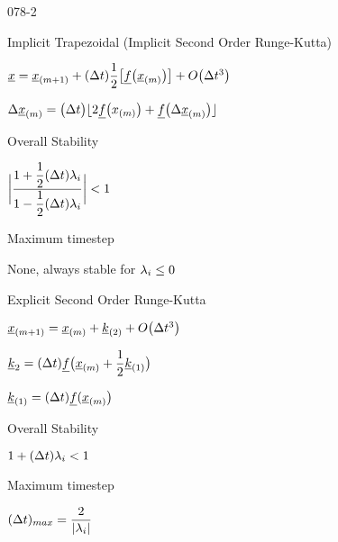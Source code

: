 \begin{mitframe}{078-2}
\begin{listone}
	\item Implicit Trapezoidal (Implicit Second Order Runge-Kutta)
    \begin{listtwo}
    	\item $\uline{\disp}=\uline{\disp}_{(\mass+1)}+(\iipf\timet)\dfrac{1}{2}\big[\uline{\fug}\big(\uline{\disp}_{(\mass)}\big)\big]+O\big(\iipf\timet^3\big)$
        \item $\iipf\uline{\disp}_{(\mass)}=\big(\iipf\timet\big)\lfloor{2}\uline{\fug}\big(\disp_{(\mass)}\big)+\uline{\fug}\big(\iipf\uline{\disp}_{(\mass)}\big)\rfloor$
		\item Overall Stability
        	\begin{listthree}
            	\item $\bigg|\dfrac{1+\dfrac{1}{2}(\iipf\timet)\wavel_{\state}}{1-\dfrac{1}{2}(\iipf\timet)\wavel_{\state}}\bigg|<1$
            \end{listthree}
        \item Maximum timestep
			\begin{listthree}
            	\item None, always stable for $\wavel_{\state}\leq{0}$
            \end{listthree}
    \end{listtwo}
    \item Explicit Second Order Runge-Kutta
    	\begin{listtwo}
        	\item $\uline{\disp}_{(\mass+1)}=\uline{\disp}_{(\mass)}+\uline{\thermcond}_{(2)}+O\big(\iipf\timet^3\big)$
            \begin{listthree}
            	\item $\uline{\thermcond}_{2}=(\iipf\timet)\uline{\fug}\big(\uline{\disp}_{(\mass)}+\dfrac{1}{2}\uline{\thermcond}_{(1)}\big)$
                \item $\uline{\thermcond}_{(1)}=(\iipf\timet)\uline{\fug}(\uline{\disp}_{(\mass)}\big)$
            \end{listthree}
            \item Overall Stability
            	\begin{listthree}
                	\item $1+(\iipf\timet)\wavel_{\state}<{1}$
                \end{listthree}
            \item Maximum timestep
            	\item $(\iipf\timet)_{max}=\dfrac{2}{|\wavel_{\state}|}$
                
        \end{listtwo}
\end{listone}        
\end{mitframe}